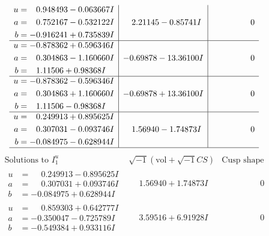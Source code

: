 \documentclass[1p]{elsarticle_modified}
\theoremstyle{definition}
\newcommand{\I}{\sqrt{-1}}
\begin{document}
$$\begin{array}{c|c|c}
\begin{aligned}
u &= \phantom{-}0.948493 - 0.063667 I \\
a &= \phantom{-}0.752167 - 0.532122 I \\
b &= -0.916241 + 0.735839 I\end{aligned}
 & \phantom{-}2.21145 - 0.85741 I & \phantom{-0.000000 } 0 \\ \hline\begin{aligned}
u &= -0.878362 + 0.596346 I \\
a &= \phantom{-}0.304863 - 1.160660 I \\
b &= \phantom{-}1.11506 + 0.98368 I\end{aligned}
 & -0.69878 - 13.36100 I & \phantom{-0.000000 } 0 \\ \hline\begin{aligned}
u &= -0.878362 - 0.596346 I \\
a &= \phantom{-}0.304863 + 1.160660 I \\
b &= \phantom{-}1.11506 - 0.98368 I\end{aligned}
 & -0.69878 + 13.36100 I & \phantom{-0.000000 } 0 \\ \hline\begin{aligned}
u &= \phantom{-}0.249913 + 0.895625 I \\
a &= \phantom{-}0.307031 - 0.093746 I \\
b &= -0.084975 - 0.628944 I\end{aligned}
 & \phantom{-}1.56940 - 1.74873 I & \phantom{-0.000000 } 0\\
 \hline 
 \end{array}$$\newpage$$\begin{array}{c|c|c}  
\text{Solutions to }I^u_{1}& \I (\text{vol} + \sqrt{-1}CS) & \text{Cusp shape}\\
 \hline 
\begin{aligned}
u &= \phantom{-}0.249913 - 0.895625 I \\
a &= \phantom{-}0.307031 + 0.093746 I \\
b &= -0.084975 + 0.628944 I\end{aligned}
 & \phantom{-}1.56940 + 1.74873 I & \phantom{-0.000000 } 0 \\ \hline\begin{aligned}
u &= \phantom{-}0.859303 + 0.642777 I \\
a &= -0.350047 - 0.725789 I \\
b &= -0.549384 + 0.933116 I\end{aligned}
 & \phantom{-}3.59516 + 6.91928 I & \phantom{-0.000000 } 0 \\ \hline\begin{aligned}

\end{aligned}
\end{array}$$
\end{document}
